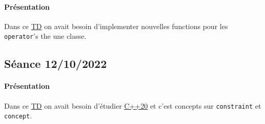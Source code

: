 \documentclass{article}
\begin{document}
\paragraph{Présentation}Dans ce \href{https://perso.ensta-paris.fr/~bmonsuez/Cours/doku.php?id=in204:seances:seance5}{TD} on avait besoin d'implementer nouvelles functions pour les \texttt{operator}'s the une classe.
\begin{scriptsize}\mycode
    
\end{scriptsize}
\begin{scriptsize}\mycode
    
\end{scriptsize}

\newpage\subsection{Séance 12/10/2022}
\paragraph{Présentation}Dans ce \href{https://perso.ensta-paris.fr/~bmonsuez/Cours/doku.php?id=in204:seances:seance6}{TD} on avait besoin d'étudier \href{https://isocpp.org/blog/2021/11/cpp-20-concepts}{C++20} et c'est concepts sur \texttt{constraint} et \texttt{concept}.
\begin{scriptsize}\mycode
    
\end{scriptsize}
\end{document}
